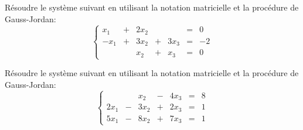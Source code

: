 \begin{exerciceC}
	Résoudre le système suivant en utilisant la notation matricielle et la procédure de Gauss-Jordan:
	\[
	\left\{
	\begin{matrix}
	x_1 &+& 2x_2 &&  &=& 0 \\
	-x_1 &+& 3x_2 &+& 3x_3 &=& -2 \\
	&& x_2 &+& x_3 &=& 0
	\end{matrix}
	\right.
	\]
\end{exerciceC}
\begin{exerciceB}
	Résoudre le système suivant en utilisant la notation matricielle et la procédure de Gauss-Jordan:
	\[
	\left\{
	\begin{matrix}
	&& x_2 &-& 4x_3  &=& 8 \\
	2x_1 &-& 3x_2 &+& 2x_3 &=& 1 \\
	5x_1&-& 8x_2 &+& 7x_3 &=& 1
	\end{matrix}
	\right.
	\]
\end{exerciceB}



